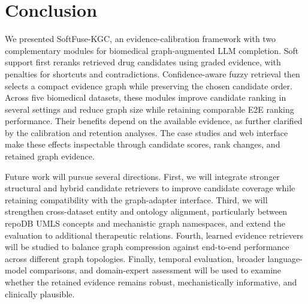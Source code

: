 \documentclass[pdflatex,sn-mathphys-num]{sn-jnl}
\newcommand{\softfuse}{SoftFuse-KGC}
\begin{document}

\section{Conclusion}
\label{sec:conclusion}


\begin{revisionblock}
We presented \softfuse{}, an evidence-calibration framework with two complementary modules for biomedical graph-augmented LLM completion. Soft support first reranks retrieved drug candidates using graded evidence, with penalties for shortcuts and contradictions. Confidence-aware fuzzy retrieval then selects a compact evidence graph while preserving the chosen candidate order. Across five biomedical datasets, these modules improve candidate ranking in several settings and reduce graph size while retaining comparable E2E ranking performance. Their benefits depend on the available evidence, as further clarified by the calibration and retention analyses. The case studies and web interface make these effects inspectable through candidate scores, rank changes, and retained graph evidence.
\end{revisionblock}


Future work will pursue several directions. First, we will integrate stronger structural and hybrid candidate retrievers to improve candidate coverage while retaining compatibility with the graph-adapter interface.  Third, we will strengthen cross-dataset entity and ontology alignment, particularly between repoDB UMLS concepts and mechanistic graph namespaces, and extend the evaluation to additional therapeutic relations. Fourth, learned evidence retrievers will be studied to balance graph compression against end-to-end performance across different graph topologies. Finally, temporal evaluation, broader language-model comparisons, and domain-expert assessment will be used to examine whether the retained evidence remains robust, mechanistically informative, and clinically plausible.


\backmatter
\end{document}
